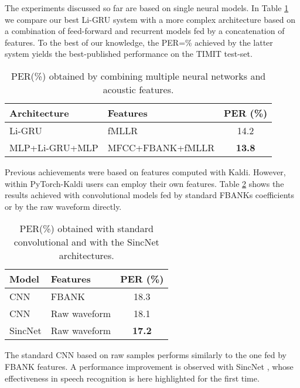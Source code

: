 \documentclass{article}
\begin{document}
The experiments discussed so far are based on single neural models. In Table \ref{tab:res3} we compare our best Li-GRU system with a more complex architecture based on a combination of feed-forward and recurrent models fed by a concatenation of features. To the best of our knowledge, the PER=\% achieved by the latter system yields the best-published performance on the TIMIT test-set. 
\begin{table}[t!]
\caption{PER(\%) obtained by combining multiple neural networks and acoustic features.}
\centering

\begin{tabular}{l|lc}  
Architecture         & Features & PER (\%) \\ \hline
Li-GRU       &    fMLLR     &    14.2  \\ 
MLP+Li-GRU+MLP &    MFCC+FBANK+fMLLR    &   \textbf{13.8}     \\ 
\bottomrule
\end{tabular}
\label{tab:res3}
\end{table}

Previous achievements were based on features computed with Kaldi. However, within PyTorch-Kaldi users can employ their own features. Table \ref{tab:res4} shows the results achieved with convolutional models fed by standard FBANKs coefficients or by the raw waveform directly.
\begin{table}[t!]
\caption{PER(\%) obtained with standard convolutional and with the SincNet architectures.}
\centering

\begin{tabular}{l|lc}  
Model         & Features & PER (\%) \\ \hline
CNN       &    FBANK     &    18.3  \\ 
CNN &    Raw waveform   &   18.1     \\ 
SincNet &    Raw waveform    &   \textbf{17.2 }     \\
\bottomrule
\end{tabular}
\label{tab:res4}
\end{table}
The standard CNN based on raw samples performs similarly to the one fed by FBANK features. A performance improvement is observed with SincNet \cite{SincNet}, whose effectiveness in speech recognition is here highlighted for the first time.
\end{document}
